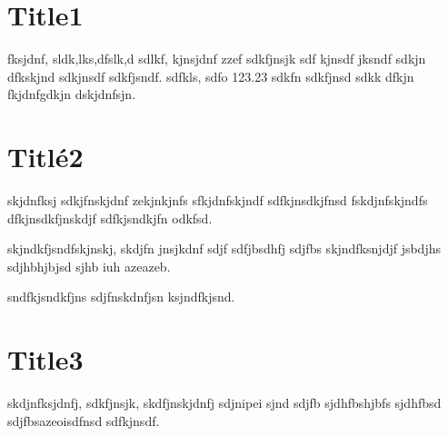 \documentclass{article}
\begin{document}
%
\section{Title1}
fksjdnf, sldk,lks,dfslk,d sdlkf, kjnsjdnf zzef sdkfjnsjk sdf kjnsdf jksndf
sdkjn dfkskjnd sdkjnsdf sdkfjsndf. sdfkls, sdfo 123.23 sdkfn sdkfjnsd sdkk
dfkjn fkjdnfgdkjn dskjdnfsjn.

\section{Titlé2}
skjdnfksj sdkjfnskjdnf zekjnkjnfs sfkjdnfskjndf sdfkjnsdkjfnsd fskdjnfskjndfs
dfkjnsdkfjnskdjf sdfkjsndkjfn odkfsd.

skjndkfjsndfskjnskj, skdjfn jnsjkdnf sdjf sdfjbsdhfj sdjfbs skjndfksnjdjf
jsbdjhs sdjhbhjbjsd sjhb iuh azeazeb.

sndfkjsndkfjns sdjfnskdnfjsn ksjndfkjsnd.

\section{Title3}
skdjnfksjdnfj, sdkfjnsjk, skdfjnskjdnfj sdjnipei sjnd sdjfb sjdhfbshjbfs
sjdhfbsd sdjfbsazeoisdfnsd sdfkjnsdf.

%
\end{document}
